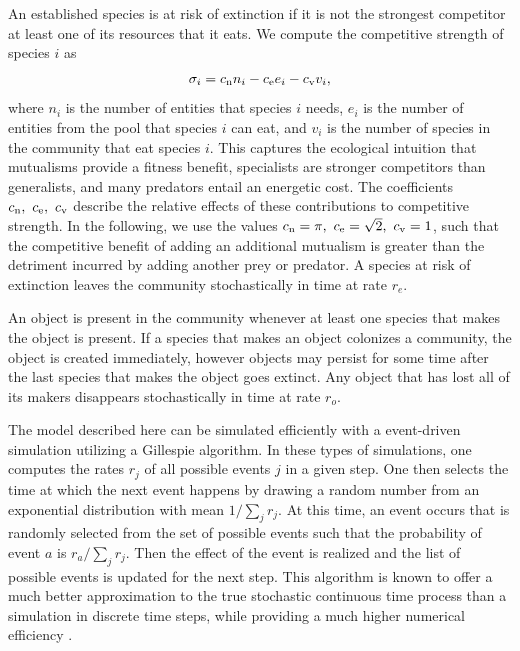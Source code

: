 \documentclass[9pt,twocolumn,twoside]{pnas-new}
\newcommand{\rr}[1]{{\rm #1}}
\begin{document}
{  An established species is at risk of extinction if it is not the strongest competitor at least one of its resources that it eats.
  We compute the competitive strength of species $i$ as
  \begin{equation}
    \sigma_i = c_\rr{n} n_i - c_\rr{e} e_i - c_\rr{v} v_i,
  \end{equation}
  where $n_i$ is the number of entities that species $i$ needs, $e_i$ is the number of entities from the pool that species $i$ can eat, and $v_i$ is the number of species in the community that eat species $i$.
  This captures the ecological intuition that mutualisms provide a fitness benefit, specialists are stronger competitors than generalists, and many predators entail an energetic cost.
  The coefficients $c_\rr{n},~c_\rr{e},~c_\rr{v}$ describe the relative effects of these contributions to competitive strength.
  In the following, we use the values $c_\rr{n} = \pi,~c_\rr{e}=\sqrt{2},~c_\rr{v}=1$, such that the competitive benefit of adding an additional mutualism is greater than the detriment incurred by adding another prey or predator.
  A species at risk of extinction leaves the community stochastically in time at rate $r_e$.

  An object is present in the community whenever at least one species that makes the object is present.
  If a species that makes an object colonizes a community, the object is created immediately, however objects may persist for some time after the last species that makes the object goes extinct.
  Any object that has lost all of its makers disappears stochastically in time at rate $r_o$.

  The model described here can be simulated efficiently with a event-driven simulation utilizing a Gillespie algorithm.
  In these types of simulations, one computes the rates $r_j$ of all possible events $j$ in a given step.
  One then selects the time at which the next event happens by drawing a random number from an exponential distribution with mean $1/\sum_j{r_j}$.
  At this time, an event occurs that is randomly selected from the set of possible events such that the probability of event $a$ is $r_a/\sum_j{r_j}$.
  Then the effect of the event is realized and the list of possible events is updated for the next step.
  This algorithm is known to offer a much better approximation to the true stochastic continuous time process than a simulation in discrete time steps, while providing a much higher numerical efficiency \cite{Gillespie1977}.}
\end{document}
